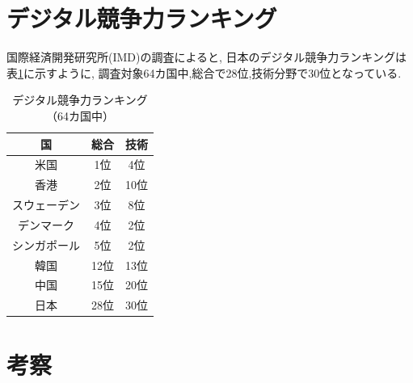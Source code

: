 \documentclass[a4paper,11pt,dvipdfmx]{ujarticle}
\begin{document}
\section{デジタル競争力ランキング}

国際経済開発研究所(IMD)の調査\cite{imd}によると,
日本のデジタル競争力ランキングは表\ref{tbl:b}に示すように,
調査対象64カ国中,総合で28位,技術分野で30位となっている.

\begin{table}[htbp]
    \centering
    \caption{デジタル競争力ランキング（64カ国中）}\label{tbl:b}
    \begin{tabular}{|c|c|c|}
        \hline
        国 & 総合 & 技術 \\
        \hline
        米国 & 1位 & 4位 \\
        \hline
        香港 & 2位 & 10位 \\
        \hline
        スウェーデン & 3位 & 8位 \\
        \hline
        デンマーク & 4位 & 2位 \\
        \hline
        シンガポール & 5位 & 2位 \\
        \hline
        \hline
        韓国 & 12位 & 13位 \\
        \hline
        中国 & 15位 & 20位 \\
        \hline
        \hline
        日本 & 28位 & 30位 \\
        \hline
    \end{tabular}
\end{table}

    



\section{考察}
\end{document}
